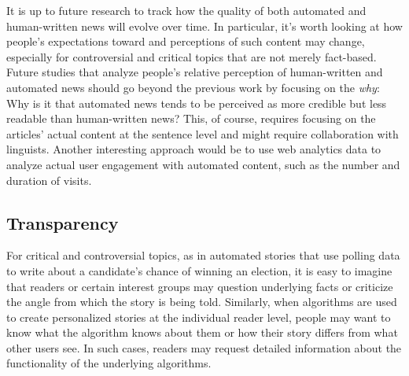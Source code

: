 \documentclass[notoc, symmetric, nobib, nols]{towcenter-guideto-book}
\begin{document}
It is up to future research to track how the quality of both automated and human-written news will evolve over time. In particular, it's worth looking at how people's expectations toward and perceptions of such content may change, especially for controversial and critical topics that are not merely fact-based. Future studies that analyze people's relative perception of human-written and automated news should go beyond the previous work by focusing on the \textit{why}: Why is it that automated news tends to be perceived as more credible but less readable than human-written news? This, of course, requires focusing on the articles' actual content at the sentence level and might require collaboration with linguists. Another interesting approach would be to use web analytics data to analyze actual user engagement with automated content, such as the number and duration of visits.

\subsection{Transparency} 

For critical and controversial topics, as in automated stories that use polling data to write about a candidate's chance of winning an election, it is easy to imagine that readers or certain interest groups may question underlying facts or criticize the angle from which the story is being told. Similarly, when algorithms are used to create personalized stories at the individual reader level, people may want to know what the algorithm knows about them or how their story differs from what other users see. In such cases, readers may request detailed information about the functionality of the underlying algorithms. 
\end{document}
